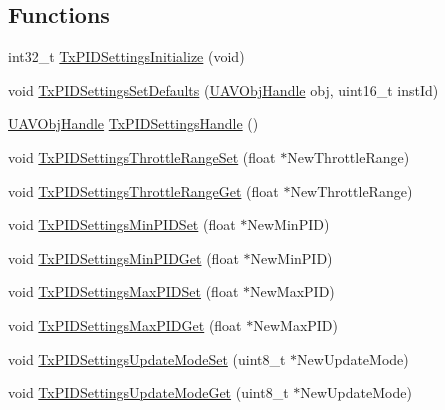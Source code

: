 \subsection*{\-Functions}
\begin{DoxyCompactItemize}
\item 
int32\-\_\-t \hyperlink{group___tx_p_i_d_settings_ga9f7d71fd436087c924f3d1b21347b6c5}{\-Tx\-P\-I\-D\-Settings\-Initialize} (void)
\item 
void \hyperlink{group___tx_p_i_d_settings_gab360bb95562bc72e1a3fd9dcbc087334}{\-Tx\-P\-I\-D\-Settings\-Set\-Defaults} (\hyperlink{targets_2_u_a_v_objects_2inc_2uavobjectmanager_8h_a279053e22be53ce9f895043aaeb91e3b}{\-U\-A\-V\-Obj\-Handle} obj, uint16\-\_\-t inst\-Id)
\item 
\hyperlink{targets_2_u_a_v_objects_2inc_2uavobjectmanager_8h_a279053e22be53ce9f895043aaeb91e3b}{\-U\-A\-V\-Obj\-Handle} \hyperlink{group___tx_p_i_d_settings_ga339b6e26e8a5fb0858a605b4fc77e7af}{\-Tx\-P\-I\-D\-Settings\-Handle} ()
\item 
void \hyperlink{group___tx_p_i_d_settings_ga6fb4db5b4afc03ba1c61a451e634c74a}{\-Tx\-P\-I\-D\-Settings\-Throttle\-Range\-Set} (float $\ast$\-New\-Throttle\-Range)
\item 
void \hyperlink{group___tx_p_i_d_settings_ga8cfbc82f50d7d1deaf99f68ccd7a8eaf}{\-Tx\-P\-I\-D\-Settings\-Throttle\-Range\-Get} (float $\ast$\-New\-Throttle\-Range)
\item 
void \hyperlink{group___tx_p_i_d_settings_gaa605d050ad115d257c603d431203c712}{\-Tx\-P\-I\-D\-Settings\-Min\-P\-I\-D\-Set} (float $\ast$\-New\-Min\-P\-I\-D)
\item 
void \hyperlink{group___tx_p_i_d_settings_gaefd66f4b5d7841b3be005f5b026ff66d}{\-Tx\-P\-I\-D\-Settings\-Min\-P\-I\-D\-Get} (float $\ast$\-New\-Min\-P\-I\-D)
\item 
void \hyperlink{group___tx_p_i_d_settings_ga6d92d2cc50d3844a9564ff2a0f98a850}{\-Tx\-P\-I\-D\-Settings\-Max\-P\-I\-D\-Set} (float $\ast$\-New\-Max\-P\-I\-D)
\item 
void \hyperlink{group___tx_p_i_d_settings_ga56ee0edfff9db7170af44f2c82dbda2b}{\-Tx\-P\-I\-D\-Settings\-Max\-P\-I\-D\-Get} (float $\ast$\-New\-Max\-P\-I\-D)
\item 
void \hyperlink{group___tx_p_i_d_settings_ga6c32baa48a6af7e81f92dbfbd7939c2e}{\-Tx\-P\-I\-D\-Settings\-Update\-Mode\-Set} (uint8\-\_\-t $\ast$\-New\-Update\-Mode)
\item 
void \hyperlink{group___tx_p_i_d_settings_gadf764298fa9f6500ee6ebec38b4954ef}{\-Tx\-P\-I\-D\-Settings\-Update\-Mode\-Get} (uint8\-\_\-t $\ast$\-New\-Update\-Mode)

\end{DoxyCompactItemize}
